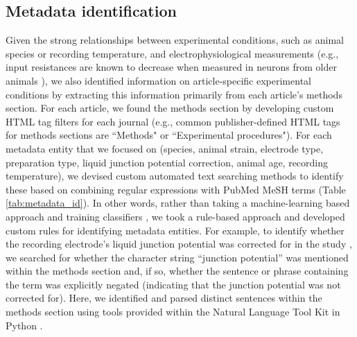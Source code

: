 \documentclass{template/frontiersSCNS} %
\begin{document}
\subsection{Metadata identification}
Given the strong relationships between experimental conditions, such as animal species or recording temperature, and electrophysiological measurements (e.g., input resistances are known to decrease when measured in neurons from older animals \citep{zhu_maturation_2000,okaty_transcriptional_2009,kinnischtzke_postnatal_2012}), we also identified information on article-specific experimental conditions by extracting this information primarily from each article's methods section.  
For each article, we found the methods section by developing custom HTML tag filters for each journal (e.g., common publisher-defined HTML tags for methods sections are ``Methods" or ``Experimental procedures").  
For each metadata entity that we focused on (species, animal strain, electrode type, preparation type, liquid junction potential correction, animal age, recording temperature), we devised custom automated text searching methods to identify these based on combining regular expressions \citep{thompson_programming_1968} with PubMed MeSH terms (Table \ref{tab:metadata_id}).  
In other words, rather than taking a machine-learning based approach and training classifiers \citep{mccallum_mallet:_2002}, we took a rule-based approach and developed custom rules for identifying metadata entities.  
For example, to identify whether the recording electrode's liquid junction potential was corrected for in the study \citep{neher_[6]_1992}, we searched for whether the character string ``junction potential'' was mentioned within the methods section and, if so, whether the sentence or phrase containing the term was explicitly negated (indicating that the junction potential was not corrected for).  
Here, we identified and parsed distinct sentences within the methods section using tools provided within the Natural Language Tool Kit in Python \citep{bird_natural_2009}.
\end{document}
